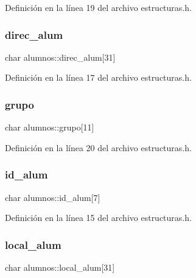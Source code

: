 Definición en la línea 19 del archivo estructuras.\+h.

\mbox{\label{structalumnos_aa02cb94abeb6fd35003b880da9e41899}} 
\subsubsection{\texorpdfstring{direc\+\_\+alum}{direc\_alum}}
{\footnotesize\ttfamily char alumnos\+::direc\+\_\+alum\mbox{[}31\mbox{]}}



Definición en la línea 17 del archivo estructuras.\+h.

\mbox{\label{structalumnos_a1100c8a658fcb00dd7b0a057b1cd0c09}} 
\subsubsection{\texorpdfstring{grupo}{grupo}}
{\footnotesize\ttfamily char alumnos\+::grupo\mbox{[}11\mbox{]}}



Definición en la línea 20 del archivo estructuras.\+h.

\mbox{\label{structalumnos_a960ce04015926176477962a5c4199290}} 
\subsubsection{\texorpdfstring{id\+\_\+alum}{id\_alum}}
{\footnotesize\ttfamily char alumnos\+::id\+\_\+alum\mbox{[}7\mbox{]}}



Definición en la línea 15 del archivo estructuras.\+h.

\mbox{\label{structalumnos_ac07a90b981cceea8fc4bf627f4126c19}} 
\subsubsection{\texorpdfstring{local\+\_\+alum}{local\_alum}}
{\footnotesize\ttfamily char alumnos\+::local\+\_\+alum\mbox{[}31\mbox{]}}



